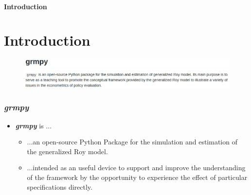 \begin{frame}\begin{center}
\LARGE\textbf{Introduction}
\end{center}\end{frame}

\section{Introduction}
\begin{frame}
\begin{figure}
  \includegraphics[scale=0.3]{../material/05_grmpy_tutorial/grmpy_intro.jpg}
\end{figure}
\end{frame}

\begin{frame}
\frametitle{\textit{grmpy}}

\begin{itemize}\setlength\itemsep{1em}
  \item \textit{\textbf{grmpy}} is ...
    \begin{itemize}\setlength\itemsep{1em}
      \item ...an open-source Python Package for the simulation and estimation of the generalized Roy model.
      \item ...intended as an useful device to support and improve the understanding of the framework by the opportunity to experience the effect of particular specifications directly.
    \end{itemize}
\end{itemize}
\end{frame}
